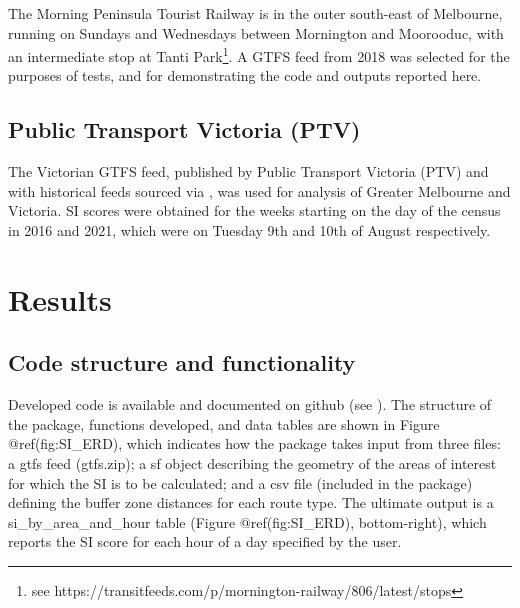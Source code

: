 \documentclass[preprint, 3p,
authoryear]{elsarticle} %
\begin{document}
The Morning Peninsula Tourist Railway is in the outer south-east of
Melbourne, running on Sundays and Wednesdays between Mornington and
Moorooduc, with an intermediate stop at Tanti Park\footnote{see
  https://transitfeeds.com/p/mornington-railway/806/latest/stops}. A
GTFS feed from 2018 was selected for the purposes of tests, and for
demonstrating the code and outputs reported here.

\hypertarget{public-transport-victoria-ptv}{%
\subsection{Public Transport Victoria
(PTV)}\label{public-transport-victoria-ptv}}

The Victorian GTFS feed, published by Public Transport Victoria (PTV)
and with historical feeds sourced via
\citet{transitfeeds_victoria:2023aa}, was used for analysis of Greater
Melbourne and Victoria. SI scores were obtained for the weeks starting
on the day of the census in 2016 and 2021, which were on Tuesday 9th and
10th of August respectively.

\hypertarget{results}{%
\section{Results}\label{results}}

\hypertarget{code-structure-and-functionality}{%
\subsection{Code structure and
functionality}\label{code-structure-and-functionality}}

Developed code is available and documented on github (see
\citet{gtfssupplyindex_github}). The structure of the package, functions
developed, and data tables are shown in Figure @ref(fig:SI\_ERD), which
indicates how the package takes input from three files: a gtfs feed
(gtfs.zip); a sf object describing the geometry of the areas of interest
for which the SI is to be calculated; and a csv file (included in the
package) defining the buffer zone distances for each route type. The
ultimate output is a si\_by\_area\_and\_hour table (Figure
@ref(fig:SI\_ERD), bottom-right), which reports the SI score for each
hour of a day specified by the user.
\end{document}
